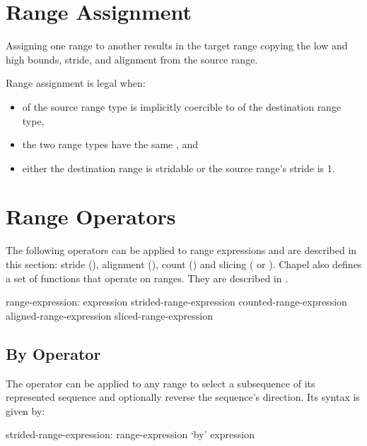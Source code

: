 \section{Range Assignment}
\label{Range_Assignment}

Assigning one range to another results in the target range
copying the low and high bounds, stride, and alignment
from the source range.

Range assignment is legal when:
\begin{itemize}
\item {} of the source range type is implicitly coercible
       to  of the destination range type,
\item the two range types have the same , and
\item either the destination range is stridable or the source range's
      stride is 1.
\end{itemize}


\section{Range Operators}
\label{Range_Operators}

The following operators can be applied to range
expressions and are described in this section: stride (),
alignment (), count (\chpl{\#}) and slicing (\chpl{\(\)}
or \chpl{\[\]}).
Chapel also defines a set of functions that operate on ranges.
They are described in .

\begin{syntax}
range-expression:
  expression
  strided-range-expression
  counted-range-expression
  aligned-range-expression
  sliced-range-expression
\end{syntax}

\subsection{By Operator}
\label{By_Operator_For_Ranges}

The  operator can be applied to any range to select
a subsequence of its represented sequence and optionally reverse
the sequence's direction.
Its syntax is given by:
\begin{syntax}
strided-range-expression:
  range-expression `by' expression
\end{syntax}

